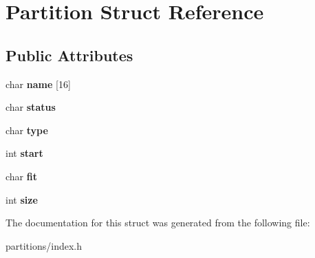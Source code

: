 \hypertarget{structPartition}{}\section{Partition Struct Reference}
\label{structPartition}
\subsection*{Public Attributes}
\begin{DoxyCompactItemize}
\item 
\mbox{\label{structPartition_ad8c05e34c6cdc7c4eee19d16a67854d9}} 
char {\bfseries name} \mbox{[}16\mbox{]}
\item 
\mbox{\label{structPartition_a4d600410bd3407200dcaaf313bf7db86}} 
char {\bfseries status}
\item 
\mbox{\label{structPartition_ac0d01dac4662df8b77eabf66cc10225b}} 
char {\bfseries type}
\item 
\mbox{\label{structPartition_ae97c6f8bd8df5c9c2054db1b601e30f7}} 
int {\bfseries start}
\item 
\mbox{\label{structPartition_ad94ac113647b74cabe78b55d87867ad8}} 
char {\bfseries fit}
\item 
\mbox{\label{structPartition_a718bdba639f222d90d23480b58caa1f9}} 
int {\bfseries size}
\end{DoxyCompactItemize}


The documentation for this struct was generated from the following file\+:\begin{DoxyCompactItemize}
\item 
partitions/index.\+h\end{DoxyCompactItemize}
